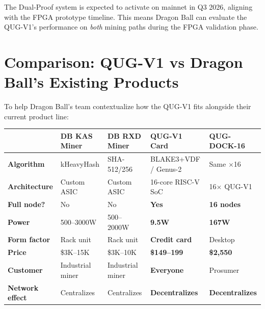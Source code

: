 \documentclass[11pt,a4paper]{article}
\begin{document}
The Dual-Proof system is expected to activate on mainnet in Q3 2026, aligning with the FPGA prototype timeline. This means Dragon Ball can evaluate the QUG-V1's performance on \textit{both} mining paths during the FPGA validation phase.


\section{Comparison: QUG-V1 vs Dragon Ball's Existing Products}

To help Dragon Ball's team contextualize how the QUG-V1 fits alongside their current product line:

\begin{center}
\begin{tabular}{@{}p{3cm}p{2.8cm}p{2.8cm}p{2.8cm}p{2.8cm}@{}}
\toprule
 & \textbf{DB KAS Miner} & \textbf{DB RXD Miner} & \textbf{QUG-V1 Card} & \textbf{QUG-DOCK-16} \\
\midrule
\textbf{Algorithm} & kHeavyHash & SHA-512/256 & BLAKE3+VDF / Genus-2 & Same $\times$16 \\
\textbf{Architecture} & Custom ASIC & Custom ASIC & 16-core RISC-V SoC & 16$\times$ QUG-V1 \\
\textbf{Full node?} & No & No & \textbf{Yes} & \textbf{16 nodes} \\
\textbf{Power} & 500--3000W & 500--2000W & \textbf{9.5W} & \textbf{167W} \\
\textbf{Form factor} & Rack unit & Rack unit & \textbf{Credit card} & Desktop \\
\textbf{Price} & \$3K--15K & \$3K--10K & \textbf{\$149--199} & \textbf{\$2,550} \\
\textbf{Customer} & Industrial miner & Industrial miner & \textbf{Everyone} & Prosumer \\
\textbf{Network effect} & Centralizes & Centralizes & \textbf{Decentralizes} & \textbf{Decentralizes} \\
\bottomrule
\end{tabular}
\end{center}
\end{document}

